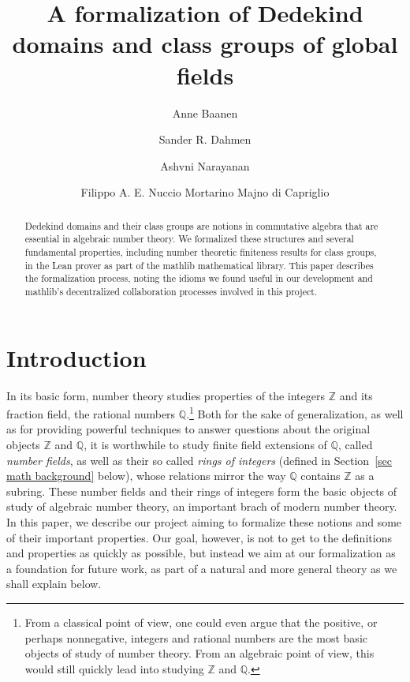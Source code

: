\documentclass[a4paper,USenglish,cleveref, autoref, thm-restate]{lipics-v2021}
\title{A formalization of Dedekind domains and class groups of global fields}
\author{Anne Baanen}{Vrije Universiteit Amsterdam, Netherlands \and \url{https://cs.vu.nl/~tbn305}}{t.baanen@vu.nl}{https://orcid.org/0000-0001-8497-3683}
{NWO Vidi grant No. 016.Vidi.189.037, Lean Forward}
\author{Sander R. Dahmen}{Vrije Universiteit Amsterdam, Netherlands \and \url{https://few.vu.nl/~sdn249/}}{s.r.dahmen@vu.nl}{https://orcid.org/0000-0002-0014-0789}{NWO Vidi grant No. 639.032.613, New Diophantine Directions}
\author{Ashvni Narayanan}{London School of Geometry and Number Theory}{a.narayanan20@imperial.ac.uk}{orcID?}{EPSRC, UK}
\author{Filippo A. E. Nuccio Mortarino Majno di Capriglio}{Univ Lyon, Université Jean Monnet Saint-Étienne, CNRS UMR 5208, Institut Camille Jordan, F-42023 Saint-\'Etienne, France\and\url {https://perso.univ-st-etienne.fr/nf51454h/index.html}}{filippo.nuccio@univ-st-etienne.fr}{https://orcid.org/0000-0002-5318-9869}{\empty}
\newcommand{\Q}{\mathbb{Q}}
\newcommand{\Z}{\mathbb{Z}}
\begin{document}
\maketitle

\begin{abstract}
Dedekind domains and their class groups are notions in commutative algebra that are essential in algebraic number theory.
We formalized these structures and several fundamental properties, including number theoretic finiteness results for class groups, in the Lean prover as part of the mathlib mathematical library.
This paper describes the formalization process,
noting the idioms we found useful in our development
and mathlib's decentralized collaboration processes involved in this project.
\end{abstract}

\section{Introduction}

In its basic form, number theory studies properties of the integers $\Z$
and its fraction field, the rational numbers $\Q$.\footnote{From a classical point of view, one could even argue that the positive, or perhaps nonnegative, integers and rational numbers are the most basic objects of study of number theory. From an algebraic point of view, this would still quickly lead into studying $\Z$ and $\Q$.}
Both for the sake of generalization, as well as for providing powerful techniques to answer questions about the original objects $\Z$ and $\Q$,
it is worthwhile to study finite field extensions of $\Q$, called \emph{number fields}, as well as their so called \emph{rings of integers} (defined in Section~\ref{sec math background} below),
whose relations mirror the way $\Q$ contains $\Z$ as a subring.
These number fields and their rings of integers form the basic objects of study of algebraic number theory, an important brach of modern number theory.
In this paper, we describe our project aiming to formalize these notions and some of their important properties.
Our goal, however, is not to get to the definitions and properties as quickly as possible,
but instead we aim at our formalization as a foundation for future work,
as part of a natural and more general theory as we shall explain below.
\end{document}

